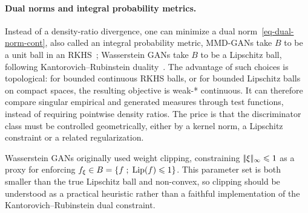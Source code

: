 \paragraph{Dual norms and integral probability metrics.}

Instead of a density-ratio divergence, one can minimize a dual norm~\eqref{eq-dual-norm-cont}, also called an integral probability metric,
MMD-GANs take $B$ to be a unit ball in an RKHS~\cite{MMD-GAN}; Wasserstein GANs take $B$ to be a Lipschitz ball, following Kantorovich--Rubinstein duality~\cite{WassersteinGAN,FrognerNIPS}. The advantage of such choices is topological: for bounded continuous RKHS balls, or for bounded Lipschitz balls on compact spaces, the resulting objective is weak-* continuous. It can therefore compare singular empirical and generated measures through test functions, instead of requiring pointwise density ratios. The price is that the discriminator class must be controlled geometrically, either by a kernel norm, a Lipschitz constraint or a related regularization.
%

\begin{rem}
	Wasserstein GANs originally used weight clipping, constraining $|\!| \xi |\!|_\infty \leqslant 1$ as a proxy for enforcing $f_\xi \in B = \left\{ f \;;\; \operatorname{Lip}(f) \leqslant 1 \right\}$. This parameter set is both smaller than the true Lipschitz ball and non-convex, so clipping should be understood as a practical heuristic rather than a faithful implementation of the Kantorovich--Rubinstein dual constraint.
\end{rem}
